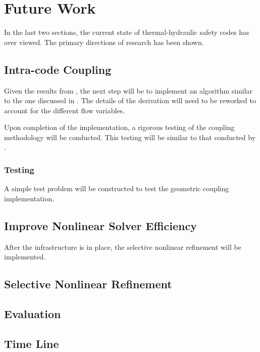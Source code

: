 \chapter{Future Work}
\label{chap:future}
In the last two sections, the current state of thermal-hydraulic safety codes has over viewed.
The primary directions of research has been shown.

\section{Intra-code Coupling}
\label{sect:future_intracode_coupling}

Given the results from , the next step will be to implement an algorithm similar to the one discussed in .
The details of the derivation will need to be reworked to account for the different flow variables.

Upon completion of the implementation, a rigorous testing of the coupling methodology will be conducted.
This testing will be similar to that conducted by \citet{Weaver2002}.

\subsection{Testing}
A simple test problem will be constructed to test the geometric coupling implementation.


\section{Improve Nonlinear Solver Efficiency}
\label{sect:future_nonlinear_solver}
After the infrastructure is in place, the selective nonlinear refinement will be implemented.

\section{Selective Nonlinear Refinement}


\section{Evaluation}
\label{sect:future_eval}


\section{Time Line}
\label{sect:future_eval}






